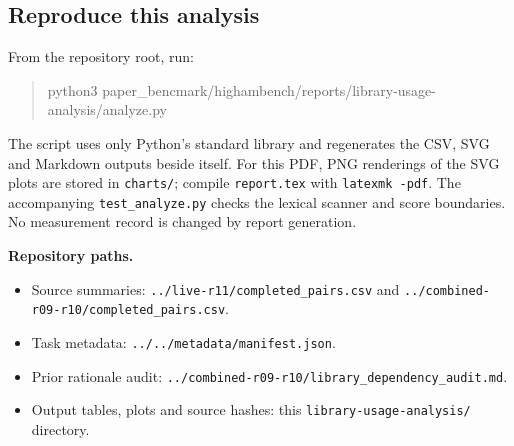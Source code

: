 \documentclass[10pt]{article}
\newcommand{\sourcepath}[1]{\nolinkurl{#1}}
\begin{document}
\subsection*{Reproduce this analysis}

From the repository root, run:
\begin{quote}\ttfamily
python3 paper\_bencmark/highambench/reports/library-usage-analysis/analyze.py
\end{quote}
The script uses only Python's standard library and regenerates the CSV, SVG and Markdown outputs beside itself. For this PDF, PNG renderings of the SVG plots are stored in \sourcepath{charts/}; compile \sourcepath{report.tex} with \texttt{latexmk -pdf}. The accompanying \sourcepath{test_analyze.py} checks the lexical scanner and score boundaries. No measurement record is changed by report generation.

\smallskip
\textbf{Repository paths.}
\begin{itemize}
\item Source summaries: \sourcepath{../live-r11/completed_pairs.csv} and \sourcepath{../combined-r09-r10/completed_pairs.csv}.
\item Task metadata: \sourcepath{../../metadata/manifest.json}.
\item Prior rationale audit: \sourcepath{../combined-r09-r10/library_dependency_audit.md}.
\item Output tables, plots and source hashes: this \sourcepath{library-usage-analysis/} directory.
\end{itemize}
\end{document}
